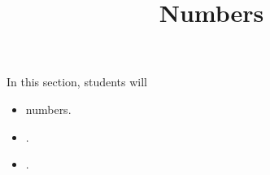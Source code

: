 \documentclass{ximera}
\title{Numbers}
\begin{document}
\begin{abstract}
\end{abstract}
\maketitle




















\begin{sectionOutcomes}
In this section, students will 

\begin{itemize}
\item numbers.
\item .
\item .
\end{itemize}
\end{sectionOutcomes}
\end{document}
